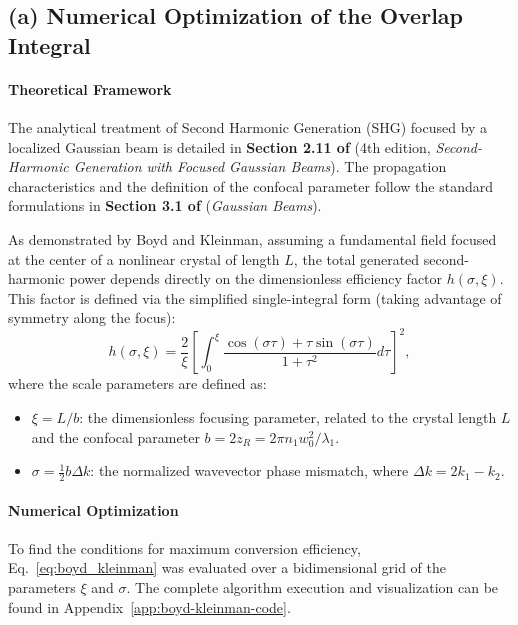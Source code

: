 \begin{resolucao}[Solution]

    \subsection*{(a) Numerical Optimization of the Overlap Integral}

        \paragraph*{Theoretical Framework}
            The analytical treatment of Second Harmonic Generation (SHG) focused by a localized Gaussian beam is detailed in \textbf{Section 2.11 of } (4th edition, \textit{Second-Harmonic Generation with Focused Gaussian Beams}). The propagation characteristics and the definition of the confocal parameter follow the standard formulations in \textbf{Section 3.1 of } (\textit{Gaussian Beams}).
        
            As demonstrated by Boyd and Kleinman, assuming a fundamental field focused at the center of a nonlinear crystal of length $L$, the total generated second-harmonic power depends directly on the dimensionless efficiency factor $h(\sigma, \xi)$. This factor is defined via the simplified single-integral form (taking advantage of symmetry along the focus):
            \begin{equation}
                h(\sigma, \xi) = \frac{2}{\xi} \left[ \int_{0}^{\xi} \frac{\cos(\sigma \tau) + \tau \sin(\sigma \tau)}{1 + \tau^2} d\tau \right]^2,
                \label{eq:boyd_kleinman}
            \end{equation}
            where the scale parameters are defined as:
            \begin{itemize}
                \item $\xi = L/b$: the dimensionless focusing parameter, related to the crystal length $L$ and the confocal parameter $b = 2 z_R = 2\pi n_1 w_0^2 / \lambda_1$.
                \item $\sigma = \frac{1}{2} b \Delta k$: the normalized wavevector phase mismatch, where $\Delta k = 2k_1 - k_2$.
            \end{itemize}
    
        \paragraph*{Numerical Optimization}
            To find the conditions for maximum conversion efficiency, Eq.~\eqref{eq:boyd_kleinman} was evaluated over a bidimensional grid of the parameters $\xi$ and $\sigma$. The complete algorithm execution and visualization can be found in Appendix~\ref{app:boyd-kleinman-code}.
            

\end{resolucao}

